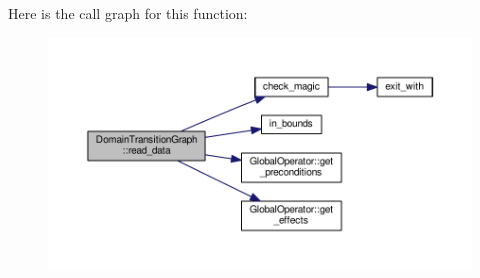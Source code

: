 Here is the call graph for this function\-:
\nopagebreak
\begin{figure}[H]
\begin{center}
\leavevmode
\includegraphics[width=350pt]{classDomainTransitionGraph_a80221d83ff7109b5f5b64a8851a4a075_cgraph}
\end{center}
\end{figure}




